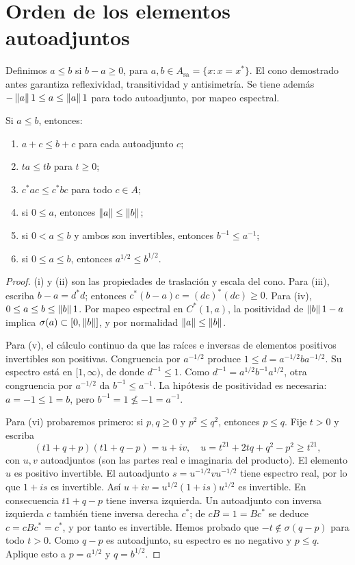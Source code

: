 \section{Orden de los elementos autoadjuntos}

Definimos $a\le b$ si $b-a\ge0$, para $a,b\in A_{\mathrm{sa}}=\{x:x=x^*\}$. El cono demostrado antes garantiza reflexividad, transitividad y antisimetría. Se tiene además $-\left\lVert a\right\rVert1\le a\le\left\lVert a\right\rVert1$ para todo autoadjunto, por mapeo espectral.

\begin{proposicion}\label{v3:propiedades-orden}
Si $a\le b$, entonces:
\begin{enumerate}[label=(\roman*)]
\item $a+c\le b+c$ para cada autoadjunto $c$;
\item $ta\le tb$ para $t\ge0$;
\item $c^*ac\le c^*bc$ para todo $c\in A$;
\item si $0\le a$, entonces $\left\lVert a\right\rVert\le\left\lVert b\right\rVert$;
\item si $0<a\le b$ y ambos son invertibles, entonces $b^{-1}\le a^{-1}$;
\item si $0\le a\le b$, entonces $a^{1/2}\le b^{1/2}$.
\end{enumerate}
\end{proposicion}
\begin{proof}
(i) y (ii) son las propiedades de traslación y escala del cono. Para (iii), escriba $b-a=d^*d$; entonces $c^*(b-a)c=(dc)^*(dc)\ge0$. Para (iv), $0\le a\le b\le\left\lVert b\right\rVert1$. Por mapeo espectral en $C^*(1,a)$, la positividad de $\left\lVert b\right\rVert1-a$ implica $\sigma(a)\subset[0,\left\lVert b\right\rVert]$, y por normalidad $\left\lVert a\right\rVert\le\left\lVert b\right\rVert$.

Para (v), el cálculo continuo da que las raíces e inversas de elementos positivos invertibles son positivas. Congruencia por $a^{-1/2}$ produce $1\le d=a^{-1/2}ba^{-1/2}$. Su espectro está en $[1,\infty)$, de donde $d^{-1}\le1$. Como $d^{-1}=a^{1/2}b^{-1}a^{1/2}$, otra congruencia por $a^{-1/2}$ da $b^{-1}\le a^{-1}$. La hipótesis de positividad es necesaria: $a=-1\le1=b$, pero $b^{-1}=1\not\le-1=a^{-1}$.

Para (vi) probaremos primero: si $p,q\ge0$ y $p^2\le q^2$, entonces $p\le q$. Fije $t>0$ y escriba
\[
 (t1+q+p)(t1+q-p)=u+iv,
 \quad u=t^21+2tq+q^2-p^2\ge t^21,
\]
con $u,v$ autoadjuntos (son las partes real e imaginaria del producto). El elemento $u$ es positivo invertible. El autoadjunto $s=u^{-1/2}vu^{-1/2}$ tiene espectro real, por lo que $1+is$ es invertible. Así $u+iv=u^{1/2}(1+is)u^{1/2}$ es invertible. En consecuencia $t1+q-p$ tiene inversa izquierda. Un autoadjunto con inversa izquierda $c$ también tiene inversa derecha $c^*$; de $cB=1=Bc^*$ se deduce $c=cBc^*=c^*$, y por tanto es invertible. Hemos probado que $-t\notin\sigma(q-p)$ para todo $t>0$. Como $q-p$ es autoadjunto, su espectro es no negativo y $p\le q$. Aplique esto a $p=a^{1/2}$ y $q=b^{1/2}$.
\end{proof}

